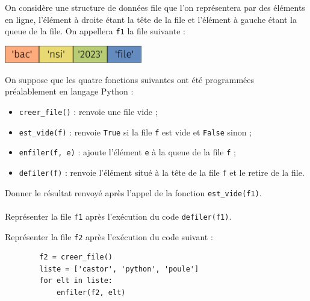 \documentclass[a4paper,12pt,eval,firamath]{nsi}
\begin{document}
On considère une structure de données file que l'on représentera par des éléments en
ligne, l'élément à droite étant la tête de la file et l'élément à gauche étant la queue de
la file.
On appellera \texttt{f1} la file suivante :
\begin{center}
      \includegraphics[width=6cm]{img/fig02.png}
\end{center}
On suppose que les quatre fonctions suivantes ont été programmées préalablement
en langage Python :
\begin{itemize}
      \item \texttt{creer_file()}  : renvoie une file vide ;
      \item \texttt{est_vide(f)}  : renvoie \texttt{True}  si la file \texttt{f}  est vide et \texttt{False}  sinon ;
      \item \texttt{enfiler(f, e)}  : ajoute l'élément \texttt{e}  à la queue de la file \texttt{f}  ;
      \item \texttt{defiler(f)}  : renvoie l'élément situé à la tête de la file \texttt{f}  et le retire de la file.
\end{itemize}

\question Donner le résultat renvoyé après l'appel de la fonction \texttt{est_vide(f1)}.\\

\\

\question Représenter la file \texttt{f1}  après l'exécution du code \texttt{defiler(f1)}.\\


\question Représenter la file \texttt{f2}  après l'exécution du code suivant :

\begin{pyc}
      \begin{verbatim}
        f2 = creer_file()
        liste = ['castor', 'python', 'poule']
        for elt in liste:
            enfiler(f2, elt)
    \end{verbatim}
\end{pyc}
\end{document}
